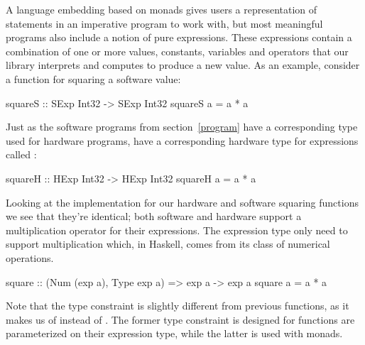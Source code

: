 \documentclass[../main.tex]{subfiles}
\begin{document}
A language embedding based on monads gives users a representation of statements in an imperative program to work with, but most meaningful programs also include a notion of pure expressions. These expressions contain a combination of one or more values, constants, variables and operators that our library interprets and computes to produce a new value. As an example, consider a function for squaring a software value:

\begin{code}
squareS :: SExp Int32 -> SExp Int32
squareS a = a * a
\end{code}


Just as the software programs from section~\ref{program} have a corresponding type used for hardware programs,  have a corresponding hardware type for expressions called :


\begin{stub}
squareH :: HExp Int32 -> HExp Int32
squareH a = a * a
\end{stub}

Looking at the implementation for our hardware and software squaring functions we see that they're identical; both software and hardware support a multiplication operator for their expressions. The expression type only need to support multiplication which, in Haskell, comes from its  class of numerical operations.


\begin{code}
square :: (Num (exp a), Type exp a) => exp a -> exp a
square a = a * a
\end{code}

\noindent Note that the type constraint is slightly different from previous functions, as it makes us of  instead of . The former type constraint is designed for functions are parameterized on their expression type, while the latter is used with monads.
\end{document}
